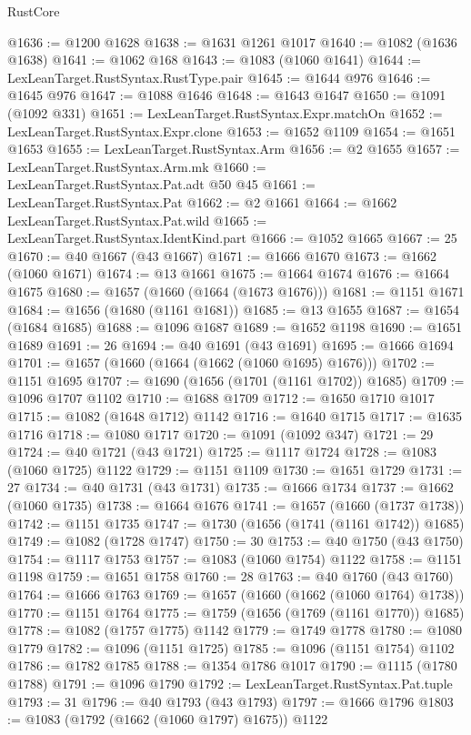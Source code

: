 \begin{lexlean}{RustCore}
\begin{coremodule}
@1636 := @1200 @1628
@1638 := @1631 @1261 @1017
@1640 := @1082 (@1636 @1638)
@1641 := @1062 @168
@1643 := @1083 (@1060 @1641)
@1644 := LexLeanTarget.RustSyntax.RustType.pair
@1645 := @1644 @976
@1646 := @1645 @976
@1647 := @1088 @1646
@1648 := @1643 @1647
@1650 := @1091 (@1092 @331)
@1651 := LexLeanTarget.RustSyntax.Expr.matchOn
@1652 := LexLeanTarget.RustSyntax.Expr.clone
@1653 := @1652 @1109
@1654 := @1651 @1653
@1655 := LexLeanTarget.RustSyntax.Arm
@1656 := @2 @1655
@1657 := LexLeanTarget.RustSyntax.Arm.mk
@1660 := LexLeanTarget.RustSyntax.Pat.adt @50 @45
@1661 := LexLeanTarget.RustSyntax.Pat
@1662 := @2 @1661
@1664 := @1662 LexLeanTarget.RustSyntax.Pat.wild
@1665 := LexLeanTarget.RustSyntax.IdentKind.part
@1666 := @1052 @1665
@1667 := 25
@1670 := @40 @1667 (@43 @1667)
@1671 := @1666 @1670
@1673 := @1662 (@1060 @1671)
@1674 := @13 @1661
@1675 := @1664 @1674
@1676 := @1664 @1675
@1680 := @1657 (@1660 (@1664 (@1673 @1676)))
@1681 := @1151 @1671
@1684 := @1656 (@1680 (@1161 @1681))
@1685 := @13 @1655
@1687 := @1654 (@1684 @1685)
@1688 := @1096 @1687
@1689 := @1652 @1198
@1690 := @1651 @1689
@1691 := 26
@1694 := @40 @1691 (@43 @1691)
@1695 := @1666 @1694
@1701 := @1657 (@1660 (@1664 (@1662 (@1060 @1695) @1676)))
@1702 := @1151 @1695
@1707 := @1690 (@1656 (@1701 (@1161 @1702)) @1685)
@1709 := @1096 @1707 @1102
@1710 := @1688 @1709
@1712 := @1650 @1710 @1017
@1715 := @1082 (@1648 @1712) @1142
@1716 := @1640 @1715
@1717 := @1635 @1716
@1718 := @1080 @1717
@1720 := @1091 (@1092 @347)
@1721 := 29
@1724 := @40 @1721 (@43 @1721)
@1725 := @1117 @1724
@1728 := @1083 (@1060 @1725) @1122
@1729 := @1151 @1109
@1730 := @1651 @1729
@1731 := 27
@1734 := @40 @1731 (@43 @1731)
@1735 := @1666 @1734
@1737 := @1662 (@1060 @1735)
@1738 := @1664 @1676
@1741 := @1657 (@1660 (@1737 @1738))
@1742 := @1151 @1735
@1747 := @1730 (@1656 (@1741 (@1161 @1742)) @1685)
@1749 := @1082 (@1728 @1747)
@1750 := 30
@1753 := @40 @1750 (@43 @1750)
@1754 := @1117 @1753
@1757 := @1083 (@1060 @1754) @1122
@1758 := @1151 @1198
@1759 := @1651 @1758
@1760 := 28
@1763 := @40 @1760 (@43 @1760)
@1764 := @1666 @1763
@1769 := @1657 (@1660 (@1662 (@1060 @1764) @1738))
@1770 := @1151 @1764
@1775 := @1759 (@1656 (@1769 (@1161 @1770)) @1685)
@1778 := @1082 (@1757 @1775) @1142
@1779 := @1749 @1778
@1780 := @1080 @1779
@1782 := @1096 (@1151 @1725)
@1785 := @1096 (@1151 @1754) @1102
@1786 := @1782 @1785
@1788 := @1354 @1786 @1017
@1790 := @1115 (@1780 @1788)
@1791 := @1096 @1790
@1792 := LexLeanTarget.RustSyntax.Pat.tuple
@1793 := 31
@1796 := @40 @1793 (@43 @1793)
@1797 := @1666 @1796
@1803 := @1083 (@1792 (@1662 (@1060 @1797) @1675)) @1122

\end{coremodule}
\end{lexlean}
